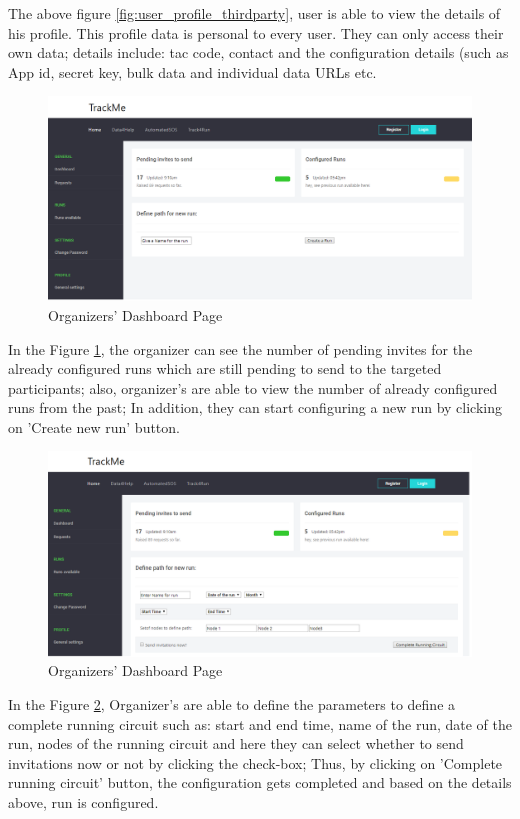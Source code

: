 \documentclass[a4paper, hidelinks, 12pt]{report}
\begin{document}
	The above figure \ref{fig:user_profile_thirdparty}, user is able to view the details of his profile. This profile data is personal to every user. They can only access their own data; details include: tac code, contact and the configuration details (such as App id, secret key, bulk data and individual data URLs etc.
	
	
	\begin{figure}[H]
		\centering
		\includegraphics[width=1\textwidth]{UI/db_organizer1.png}
		\caption[UI: Organizers' Dashboard Page]{Organizers' Dashboard Page}
		\label{fig:organizer_dashboard_1}
	\end{figure}
	In the Figure \ref{fig:organizer_dashboard_1}, the organizer can see the number of pending invites for the already configured runs which are still pending to send to the targeted participants; also, organizer's are able to view the number of already configured runs from the past; In addition, they can start configuring a new run by clicking on 'Create new run' button.
	
	\begin{figure}[H]
		\centering
		\includegraphics[width=1\textwidth]{UI/db_organizer2.png}
		\caption[UI: Organizers' Dashboard Page]{Organizers' Dashboard Page}
		\label{fig:organizer_dashboard_2}
	\end{figure}
	In the Figure \ref{fig:organizer_dashboard_2}, Organizer's are able to define the parameters to define a complete running circuit such as: start and end time, name of the run, date of the run, nodes of the running circuit and here they can select whether to send invitations now or not by clicking the check-box; Thus, by clicking on 'Complete running circuit' button, the configuration gets completed and based on the details above, run is configured.
	
\end{document}
